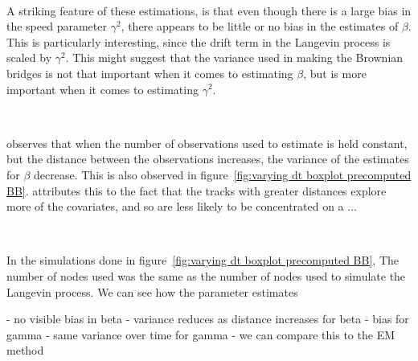 \

A striking feature of these estimations, is that even though there is a large bias in the speed parameter $\gamma^2$, there appears to be little or no bias in the estimates of $\beta$. This is particularly interesting, since the drift term in the Langevin process is scaled by $\gamma^2$. This might suggest that the variance used in making the Brownian bridges is not that important when it comes to estimating $\beta$, but is more important when it comes to estimating $\gamma^2$.

\ 

\cite{michelot_langevin_2019} observes that when the number of observations used to estimate is held constant, but the distance between the observations increases, the variance of the estimates for $\beta$ decrease. This is also observed in figure~\ref{fig:varying dt boxplot precomputed BB}. \parencite{michelot_langevin_2019} attributes this to the fact that the tracks with greater distances explore more of the covariates, and so are less likely to be concentrated on a ...


\

In the simulations done in figure~\ref{fig:varying dt boxplot precomputed BB}, The number of nodes used was the same as the number of nodes used to simulate the Langevin process. We can see how the parameter estimates 



- no visible bias in beta
- variance reduces as distance increases for beta
- bias for gamma
- same variance over time for gamma
- we can compare this to the EM method


